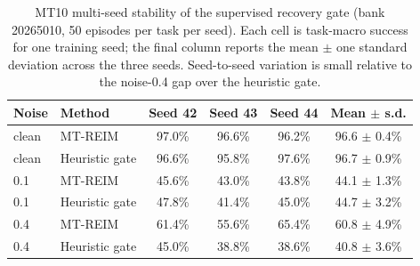 \begin{table}[t]
  \centering
  \caption{MT10 multi-seed stability of the supervised recovery gate
  (bank 20265010, 50 episodes per task per seed). Each cell is task-macro
  success for one training seed; the final column reports the mean $\pm$ one
  standard deviation across the three seeds. Seed-to-seed variation is small
  relative to the noise-0.4 gap over the heuristic gate.}
  \label{tab:mt10-seed-stability}
  \small
  \setlength{\tabcolsep}{3.4pt}
  \begin{tabular}{llcccc}
    \toprule
    Noise & Method & Seed 42 & Seed 43 & Seed 44 & Mean $\pm$ s.d. \\
    \midrule
    clean & MT-REIM & 97.0\% & 96.6\% & 96.2\% & 96.6 $\pm$ 0.4\% \\
    clean & Heuristic gate & 96.6\% & 95.8\% & 97.6\% & 96.7 $\pm$ 0.9\% \\
    \midrule
    0.1 & MT-REIM & 45.6\% & 43.0\% & 43.8\% & 44.1 $\pm$ 1.3\% \\
    0.1 & Heuristic gate & 47.8\% & 41.4\% & 45.0\% & 44.7 $\pm$ 3.2\% \\
    \midrule
    0.4 & MT-REIM & 61.4\% & 55.6\% & 65.4\% & 60.8 $\pm$ 4.9\% \\
    0.4 & Heuristic gate & 45.0\% & 38.8\% & 38.6\% & 40.8 $\pm$ 3.6\% \\
    \bottomrule
  \end{tabular}
\end{table}
